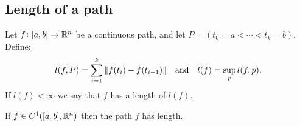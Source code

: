 \documentclass[11pt,a4paper]{article}
\begin{document}
\subsection{Length of a path}
\label{sec:length-of-a-path}
\begin{definition}
  Let $f \colon [a,b] \to \mathbb{R}^n$ be a continuous path, and let
  $P = (t_0 = a < \cdots < t_k = b)$.
  Define:
  \[
    l(f,P) = \sum_{i=1}^{k}{\|f(t_i) - f(t_{i-1})\|}
    \quad \text{and} \quad
    l(f) = \sup_{p}{l(f,p)}.
  \]
  If $l(f) < \infty$ we say that $f$ has a length of $l(f)$.
\end{definition}
\begin{proposition}
  If $f \in C^1([a,b], \mathbb{R}^n)$ then the path $f$ has length.
\end{proposition}
\end{document}
